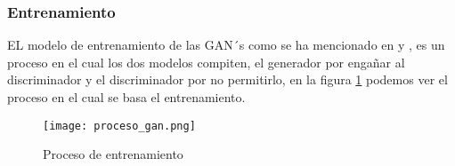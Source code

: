 \subsubsection{Entrenamiento}

EL modelo de entrenamiento de las GAN´s como se ha mencionado en \cite{GANs} y \cite{SRGAN}, es un proceso en el cual
los dos modelos compiten, el generador por engañar al discriminador y el discriminador por no permitirlo, en la figura \ref{Alexis6}
podemos ver el proceso en el cual se basa el entrenamiento.

\begin{figure}[H]
    \begin{center}
      \texttt{[image: proceso\_gan.png]}
      \caption{Proceso de entrenamiento}
      \label{Alexis6}
    \end{center}
\end{figure}



